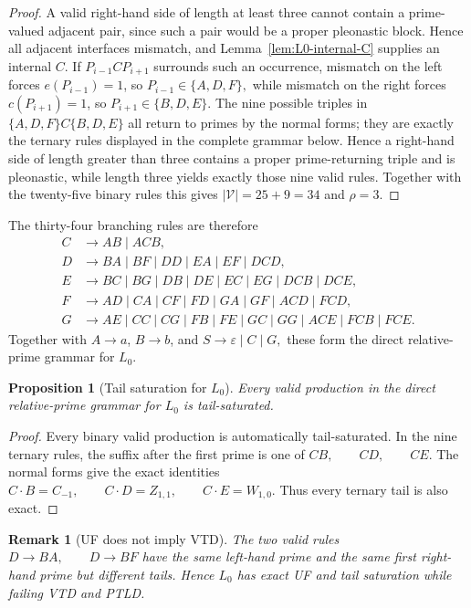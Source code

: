 \documentclass[11pt,a4paper]{article}
\newtheorem{proposition}[theorem]{Proposition}
\newtheorem{remark}[theorem]{Remark}
\newcommand{\eps}{\varepsilon}
\newcommand{\Vcal}{\mathcal V}
\begin{document}
\begin{proof}
A valid right-hand side of length at least three cannot contain a
prime-valued adjacent pair, since such a pair would be a proper
pleonastic block.  Hence all adjacent interfaces mismatch, and
Lemma~\ref{lem:L0-internal-C} supplies an internal $C$.
If $P_{i-1}CP_{i+1}$ surrounds such an occurrence, mismatch on the left
forces $e(P_{i-1})=1$, so
\(P_{i-1}\in\{A,D,F\},\)
while mismatch on the right forces $c(P_{i+1})=1$, so
\(P_{i+1}\in\{B,D,E\}.\)
The nine possible triples in $\{A,D,F\}C\{B,D,E\}$ all return to primes by the normal forms; they are exactly the ternary rules displayed in the complete grammar below.  Hence a right-hand side of length greater than three contains a proper prime-returning triple and is pleonastic, while length three yields exactly those nine valid rules.  Together with the twenty-five binary rules this gives $|\Vcal|=25+9=34$ and $\rho=3$.
\end{proof}

The thirty-four branching rules are therefore
\[
\begin{aligned}
C&\to AB\mid ACB,\\
D&\to BA\mid BF\mid DD\mid EA\mid EF\mid DCD,\\
E&\to BC\mid BG\mid DB\mid DE\mid EC\mid EG\mid DCB\mid DCE,\\
F&\to AD\mid CA\mid CF\mid FD\mid GA\mid GF\mid ACD\mid FCD,\\
G&\to AE\mid CC\mid CG\mid FB\mid FE\mid GC\mid GG\mid ACE\mid FCB\mid FCE.
\end{aligned}
\]
Together with $A\to a$, $B\to b$, and
\(S\to\eps\mid C\mid G,\)
these form the direct relative-prime grammar for $L_0$.

\begin{proposition}[Tail saturation for $L_0$]
Every valid production in the direct relative-prime grammar for $L_0$
is tail-saturated.
\end{proposition}

\begin{proof}
Every binary valid production is automatically tail-saturated.  In the
nine ternary rules, the suffix after the first prime is one of
\(CB,\qquad CD,\qquad CE.\)
The normal forms give the exact identities
\(C\cdot B=C_{-1}, \qquad C\cdot D=Z_{1,1}, \qquad C\cdot E=W_{1,0}.\)
Thus every ternary tail is also exact.
\end{proof}

\begin{remark}[UF does not imply VTD]
The two valid rules
\(D\to BA, \qquad D\to BF\)
have the same left-hand prime and the same first right-hand prime but
different tails.  Hence $L_0$ has exact UF and tail saturation while
failing VTD and PTLD.
\end{remark}
\end{document}
